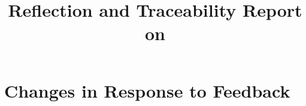 \documentclass{article}
\title{Reflection and Traceability Report on \progname}
\author{\authname}
\date{}
\begin{document}
\maketitle

\newpage

\tableofcontents

\listoftables %

\newpage


\section{Changes in Response to Feedback}




\end{document}
